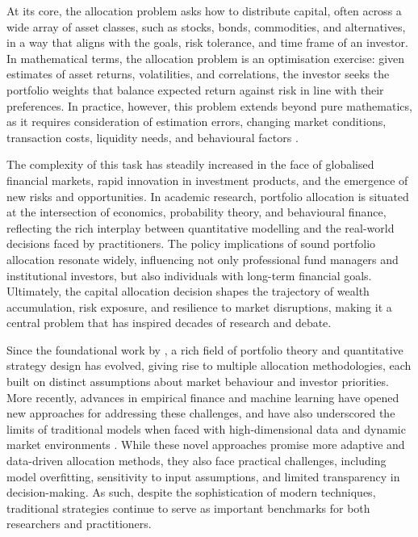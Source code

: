 \documentclass[12pt,a4paper]{report}
\begin{document}
At its core, the allocation problem asks how to distribute capital, often across a wide array of asset classes, such as stocks, bonds, commodities, and alternatives, in a way that aligns with the goals, risk tolerance, and time frame of an investor. In mathematical terms, the allocation problem is an optimisation exercise: given estimates of asset returns, volatilities, and correlations, the investor seeks the portfolio weights that balance expected return against risk in line with their preferences. In practice, however, this problem extends beyond pure mathematics, as it requires consideration of estimation errors, changing market conditions, transaction costs, liquidity needs, and behavioural factors \citep{Campbell2002}. 

The complexity of this task has steadily increased in the face of globalised financial markets, rapid innovation in investment products, and the emergence of new risks and opportunities. In academic research, portfolio allocation is situated at the intersection of economics, probability theory, and behavioural finance, reflecting the rich interplay between quantitative modelling and the real-world decisions faced by practitioners. The policy implications of sound portfolio allocation resonate widely, influencing not only professional fund managers and institutional investors, but also individuals with long-term financial goals. Ultimately, the capital allocation decision shapes the trajectory of wealth accumulation, risk exposure, and resilience to market disruptions, making it a central problem that has inspired decades of research and debate. 

Since the foundational work by \citet{Markowitz1952}, a rich field of portfolio theory and quantitative strategy design has evolved, giving rise to multiple allocation methodologies, each built on distinct assumptions about market behaviour and investor priorities. More recently, advances in empirical finance and machine learning have opened new approaches for addressing these challenges, and have also underscored the limits of traditional models when faced with high-dimensional data and dynamic market environments \citep{Gu2020}. While these novel approaches promise more adaptive and data-driven allocation methods, they also face practical challenges, including model overfitting, sensitivity to input assumptions, and limited transparency in decision-making. As such, despite the sophistication of modern techniques, traditional strategies continue to serve as important benchmarks for both researchers and practitioners.
\end{document}
